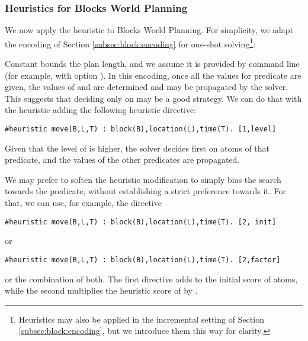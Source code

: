 \subsubsection{Heuristics for Blocks World Planning}
\label{example:blocks:world:heuristic}
We now apply the  heuristic to Blocks World Planning.  
For simplicity, we adapt the encoding of Section \ref{subsec:block:encoding} 
for one-shot solving\footnote{Heuristics may also be applied in the incremental setting of 
Section \ref{subsec:block:encoding}, but we introduce them this way for clarity.}: 

Constant  bounds the plan length, and we assume it is provided by command line (for example, with option ).
%
%
In this encoding, once all the values for predicate  are given,
the values of  and  are determined and may be propagated by the solver.
This suggests that deciding only on  may be a good strategy.
We can do that with the  heuristic 
adding the following heuristic directive:
%
\begin{lstlisting}[basicstyle=\small\ttfamily,numbers=none]
#heuristic move(B,L,T) : block(B),location(L),time(T). [1,level]
\end{lstlisting}
Given that the level of  is higher,  the solver 
decides first on atoms of that predicate,
and the values of the other predicates are propagated.

We may prefer to soften the heuristic modification to simply 
bias the search  towards the  predicate,
without establishing a strict preference towards it.  
For that, we can use, for example, the directive
\begin{lstlisting}[basicstyle=\small\ttfamily,numbers=none]
#heuristic move(B,L,T) : block(B),location(L),time(T). [2, init]
\end{lstlisting} 
or
\begin{lstlisting}[basicstyle=\small\ttfamily,numbers=none]
#heuristic move(B,L,T) : block(B),location(L),time(T). [2,factor]
\end{lstlisting}
or the combination of both.
The first directive adds  to the initial score of  atoms,
while the second multiplies the heuristic score of  by .

